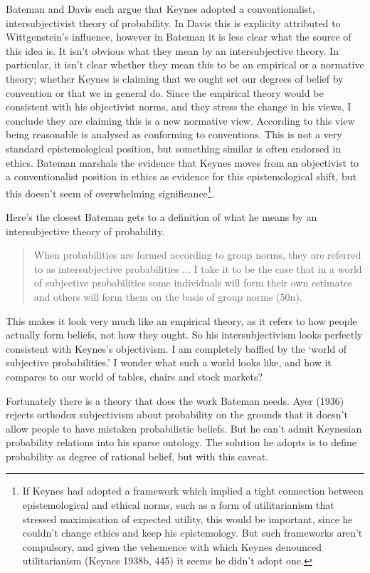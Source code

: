 \documentclass[noflushend]{philosophersimprint}
\begin{document}
Bateman and Davis each argue that Keynes adopted a conventionalist,
intersubjectivist theory of probability. In Davis this is explicity
attributed to Wittgenstein's influence, however in Bateman it is less
clear what the source of this idea is. It isn't obvious what they mean
by an intersubjective theory. In particular, it isn't clear whether they
mean this to be an empirical or a normative theory; whether Keynes is
claiming that we ought set our degrees of belief by convention or that
we in general do. Since the empirical theory would be consistent with
his objectivist norms, and they stress the change in his views, I
conclude they are claiming this is a new normative view. According to
this view being reasonable is analysed as conforming to conventions.
This is not a very standard epistemological position, but something
similar is often endorsed in ethics. Bateman marshals the evidence that
Keynes moves from an objectivist to a conventionalist position in ethics
as evidence for this epistemological shift, but this doesn't seem of
overwhelming significance\footnote{If Keynes had adopted a framework
  which implied a tight connection between epistemological and ethical
  norms, such as a form of utilitarianism that stressed maximisation of
  expected utility, this would be important, since he couldn't change
  ethics and keep his epistemology. But such frameworks aren't
  compulsory, and given the vehemence with which Keynes denounced
  utilitarianism (Keynes 1938b, 445) it seems he didn't adopt one.}.

Here's the closest Bateman gets to a definition of what he means by an
intersubjective theory of probability.

\begin{quote}
When probabilities are formed according to group norms, they are
referred to as intersubjective probabilities ... I take it to be the
case that in a world of subjective probabilities some individuals will
form their own estimates and others will form them on the basis of group
norms (50n).
\end{quote}

This makes it look very much like an empirical theory, as it refers to
how people actually form beliefs, not how they ought. So his
intersubjectivism looks perfectly consistent with Keynes's objectivism.
I am completely baffled by the `world of subjective probabilities.' I
wonder what such a world looks like, and how it compares to our world of
tables, chairs and stock markets?

Fortunately there is a theory that does the work Bateman needs. Ayer
(1936) rejects orthodox subjectivism about probability on the grounds
that it doesn't allow people to have mistaken probabilistic beliefs. But
he can't admit Keynesian probability relations into his sparse ontology.
The solution he adopts is to define probability as degree of rational
belief, but with this caveat.
\end{document}
